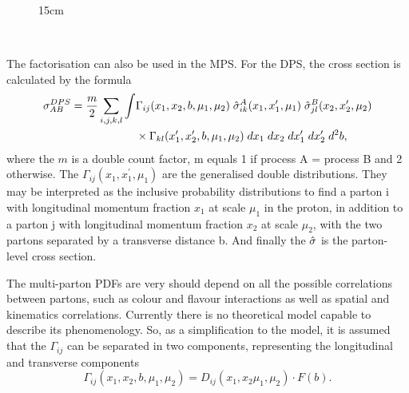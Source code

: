 \begin{figure}[!htm]{15cm}
{{
    }}\\
\end{figure}

The factorisation can also be used in the MPS. For the DPS, the cross section is calculated by the formula \cite{gaunt2010double}
\begin{equation}\label{eq:DPSxsecfull}
\begin{split}
    \sigma_{AB}^{DPS} = \frac{m}{2} \sum_{i,j,k,l}\int & \Gamma_{ij}(x_1, x_2, b, \mu_1, \mu_2) \; \Hat{\sigma}^A_{ik}(x_1, x_1^\prime, \mu_1) \; \Hat{\sigma}_{jl}^B(x_2, x_2^\prime, \mu_2) \\ & \times \Gamma_{kl}(x_1^\prime, x_2^\prime, b, \mu_1, \mu_2) \; dx_1\; dx_2\; dx_1^\prime\; dx_2^\prime\; d^2b,
\end{split}
\end{equation}
where the $m$ is a double count factor, m equals 1 if process A = process B and 2 otherwise. The $\Gamma_{ij}(x_1, x_1^\prime, \mu_1)$ are the generalised double distributions. They may be interpreted as the inclusive probability distributions to find a parton i with longitudinal momentum fraction $x_1$ at scale $\mu_1$ in the proton, in addition to a parton j with longitudinal momentum fraction $x_2$ at scale $\mu_2$, with the two partons separated by a transverse distance b. And finally the $\Hat{\sigma}$ is the parton-level cross section.

The multi-parton PDFs are very should depend on all the possible correlations between partons, such as colour and flavour interactions as well as spatial and kinematics correlations. Currently there is no theoretical model capable to describe its phenomenology. So, as a simplification to the model, it is assumed that the $\Gamma_{ij}$ can be separated in two components, representing the longitudinal and transverse components
\begin{equation}
    \Gamma_{ij}(x_1, x_2, b, \mu_1, \mu_2) = D_{ij}(x_1, x_2 \mu_1, \mu_2)\cdot F(b).
\end{equation}

